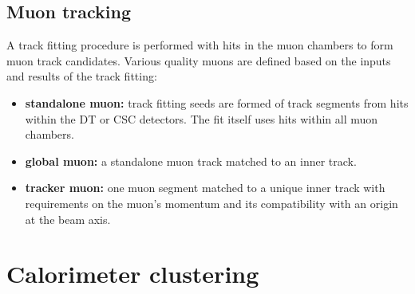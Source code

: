 \subsection{Muon tracking}\label{subsec:muon-tracking}

A track fitting procedure is performed with hits in the muon chambers to form
muon track candidates. Various quality muons are defined based on the inputs
and results of the track fitting:

\begin{itemize}
    \item \textbf{standalone muon:} track fitting seeds are formed of track
    segments from hits within the DT or CSC detectors. The fit itself uses
    hits within all muon chambers.
    \item \textbf{global muon:} a standalone muon track matched to an inner
    track.
    \item \textbf{tracker muon:} one muon segment matched to a unique inner
    track with requirements on the muon's momentum and its compatibility with
    an origin at the beam axis.
\end{itemize}


\section{Calorimeter clustering}

